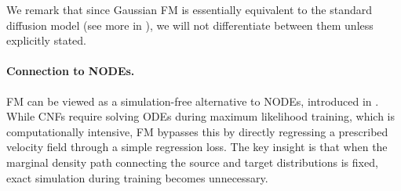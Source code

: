 \begin{table}[th]
\caption{Comparison between diffusion models (or Gaussian FM) and the general FM framework.  
Here, the general FM framework refers to the setting with two-sided conditioning, 
where $\mathbf{x}_0 \sim p_{\text{src}}$ and $\mathbf{x}_1 \sim p_{\text{tgt}}$ 
are sampled independently.}
\label{tab:framework_comparison}
\centering
{}
\end{table}
We remark that since Gaussian FM is essentially equivalent to the standard diffusion model (see more in ), we will not differentiate between them unless explicitly stated.


\paragraph{Connection to NODEs.}
FM can be viewed as a simulation-free alternative to NODEs, introduced in . While CNFs require solving ODEs during maximum likelihood training, which is computationally intensive, FM bypasses this by directly regressing a prescribed velocity field through a simple regression loss. The key insight is that when the marginal density path connecting the source and target distributions is fixed, exact simulation during training becomes unnecessary.


